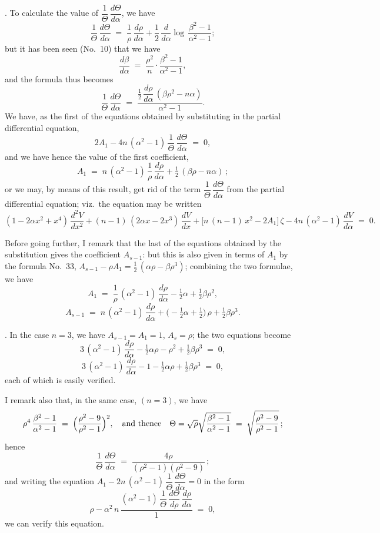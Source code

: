 \documentclass[11pt]{article}
\begin{document}
. To calculate the value of $\dfrac{1}{\Theta}\,\dfrac{d\Theta}{d\alpha}$, we have
\[
\frac{1}{\Theta}\,\frac{d\Theta}{d\alpha} \;=\; \frac{1}{\rho}\,\frac{d\rho}{d\alpha} + \frac{1}{2}\,\frac{d}{d\alpha}\!\log\,\frac{\beta^2 - 1}{\alpha^2 - 1};
\]
but it has been seen (No.~10) that we have
\[
\frac{d\beta}{d\alpha} \;=\; \frac{\rho^2}{n}\cdot\frac{\beta^2 - 1}{\alpha^2 - 1},
\]
and the formula thus becomes
\[
\frac{1}{\Theta}\,\frac{d\Theta}{d\alpha} \;=\; \frac{\tfrac{1}{2}\,\dfrac{d\rho}{d\alpha}\,(\beta\rho^2 - n\alpha)}{\alpha^2 - 1}.
\]
We have, as the first of the equations obtained by substituting in the partial differential equation,
\[
2 A_1 - 4 n\,(\alpha^2 - 1)\,\frac{1}{\Theta}\,\frac{d\Theta}{d\alpha} \;=\; 0,
\]
and we have hence the value of the first coefficient,
\[
A_1 \;=\; n\,(\alpha^2 - 1)\,\frac{1}{\rho}\,\frac{d\rho}{d\alpha} + \tfrac{1}{2}\,(\beta\rho - n\alpha)\,;
\]
or we may, by means of this result, get rid of the term $\dfrac{1}{\Theta}\,\dfrac{d\Theta}{d\alpha}$ from the partial differential equation; viz.\ the equation may be written
\[
(1 - 2\alpha x^2 + x^4)\,\frac{d^2 V}{dx^2} + (n - 1)\,(2\alpha x - 2 x^3)\,\frac{d V}{dx} + \bigl[n\,(n - 1)\,x^2 - 2 A_1\bigr]\,\zeta - 4 n\,(\alpha^2 - 1)\,\frac{d V}{d\alpha} \;=\; 0.
\]

\newpage

\noindent Before going further, I remark that the last of the equations obtained by the substitution gives the coefficient $A_{s-1}$: but this is also given in terms of $A_1$ by the formula No.~33, $A_{s-1} - \rho A_1 = \tfrac{1}{2}\,(\alpha\rho - \beta\rho^3)$; combining the two formulae, we have
\[
A_1 \;=\; \frac{1}{\rho}\,(\alpha^2 - 1)\,\frac{d\rho}{d\alpha} - \tfrac{1}{2}\alpha + \tfrac{1}{2}\beta\rho^2,
\]
\[
A_{s-1} \;=\; n\,(\alpha^2 - 1)\,\frac{d\rho}{d\alpha} + \bigl(-\tfrac{1}{2}\alpha + \tfrac{1}{2}\bigr)\,\rho + \tfrac{1}{2}\beta\rho^3.
\]

\medskip

. In the case $n = 3$, we have $A_{s-1} = A_1 = 1$, $A_s = \rho$; the two equations become
\[
3\,(\alpha^2 - 1)\,\frac{d\rho}{d\alpha} - \tfrac{1}{2}\alpha\rho - \rho^2 + \tfrac{1}{2}\beta\rho^3 \;=\; 0,
\]
\[
3\,(\alpha^2 - 1)\,\frac{d\rho}{d\alpha} - 1 - \tfrac{1}{2}\alpha\rho + \tfrac{1}{2}\beta\rho^3 \;=\; 0,
\]
each of which is easily verified.

\medskip

\noindent I remark also that, in the same case, $(n = 3)$, we have
\[
\rho^4\,\frac{\beta^2 - 1}{\alpha^2 - 1} \;=\; \Bigl(\frac{\rho^2 - 9}{\rho^2 - 1}\Bigr)^2,\quad\text{and thence}\quad \Theta = \sqrt{\rho}\sqrt{\frac{\beta^2 - 1}{\alpha^2 - 1}} \;=\; \sqrt{\frac{\rho^2 - 9}{\rho^2 - 1}}\,;
\]
hence
\[
\frac{1}{\Theta}\,\frac{d\Theta}{d\alpha} \;=\; \frac{4\rho}{(\rho^2 - 1)(\rho^2 - 9)}\,;
\]
and writing the equation $A_1 - 2 n\,(\alpha^2 - 1)\,\dfrac{1}{\Theta}\,\dfrac{d\Theta}{d\alpha} = 0$ in the form
\[
\rho - \alpha^2\,n\,\frac{(\alpha^2 - 1)\,\dfrac{1}{\Theta}\,\dfrac{d\Theta}{d\rho}\,\dfrac{d\rho}{d\alpha}}{1} \;=\; 0,
\]
we can verify this equation.
\end{document}
